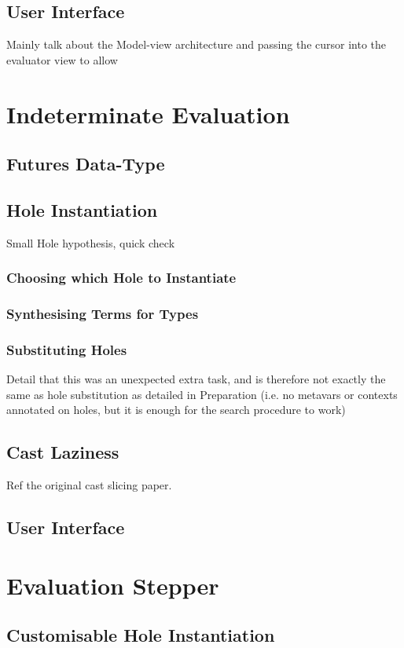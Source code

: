 \subsection{User Interface}
Mainly talk about the Model-view architecture and passing the cursor into the evaluator view to allow 

\section{Indeterminate Evaluation}\label{sec:IndetEval}
\subsection{Futures Data-Type}\label{sec:Futures}
\subsection{Hole Instantiation}\label{sec:HoleInstantiation}
Small Hole hypothesis, quick check
\subsubsection{Choosing which Hole to Instantiate}
\subsubsection{Synthesising Terms for Types}
\subsubsection{Substituting Holes}\label{sec:HoleSubstitutionImplementation}
Detail that this was an unexpected extra task, and is therefore not exactly the same as hole substitution as detailed in Preparation (i.e. no metavars or contexts annotated on holes, but it is enough for the search procedure to work)
\subsection{Cast Laziness}\label{sec:CastLaziness}
Ref the original cast slicing paper.
\subsection{User Interface}

\section{Evaluation Stepper}\label{sec:Stepper}
\subsection{Customisable Hole Instantiation}

